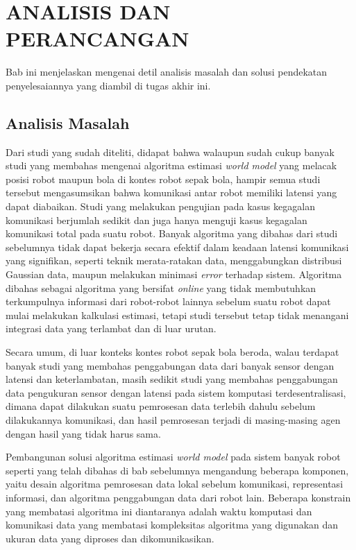 \chapter{ANALISIS DAN PERANCANGAN}

Bab ini menjelaskan mengenai detil analisis masalah dan solusi pendekatan penyelesaiannya yang diambil di tugas akhir ini.

\section{Analisis Masalah}

Dari studi yang sudah diteliti, didapat bahwa walaupun sudah cukup banyak studi yang membahas mengenai algoritma estimasi \textit{world model} yang melacak posisi robot maupun bola di kontes robot sepak bola, hampir semua studi tersebut mengasumsikan bahwa komunikasi antar robot memiliki latensi yang dapat diabaikan. Studi yang melakukan pengujian pada kasus kegagalan komunikasi berjumlah sedikit dan juga hanya menguji kasus kegagalan komunikasi total pada suatu robot. Banyak algoritma yang dibahas dari studi sebelumnya tidak dapat bekerja secara efektif dalam keadaan latensi komunikasi yang signifikan, seperti teknik merata-ratakan data, menggabungkan distribusi Gaussian data, maupun melakukan minimasi \textit{error} terhadap sistem. Algoritma \citet{ahmad2017} dibahas sebagai algoritma yang bersifat \textit{online} yang tidak membutuhkan terkumpulnya informasi dari robot-robot lainnya sebelum suatu robot dapat mulai melakukan kalkulasi estimasi, tetapi studi tersebut tetap tidak menangani integrasi data yang terlambat dan di luar urutan.

Secara umum, di luar konteks kontes robot sepak bola beroda, walau terdapat banyak studi yang membahas penggabungan data dari banyak sensor dengan latensi dan keterlambatan, masih sedikit studi yang membahas penggabungan data pengukuran sensor dengan latensi pada sistem komputasi terdesentralisasi, dimana dapat dilakukan suatu pemrosesan data terlebih dahulu sebelum dilakukannya komunikasi, dan hasil pemrosesan terjadi di masing-masing agen dengan hasil yang tidak harus sama.

Pembangunan solusi algoritma estimasi \textit{world model} pada sistem banyak robot seperti yang telah dibahas di bab sebelumnya mengandung beberapa komponen, yaitu desain algoritma pemrosesan data lokal sebelum komunikasi, representasi informasi, dan algoritma penggabungan data dari robot lain. Beberapa konstrain yang membatasi algoritma ini diantaranya adalah waktu komputasi dan komunikasi data yang membatasi kompleksitas algoritma yang digunakan dan ukuran data yang diproses dan dikomunikasikan.

